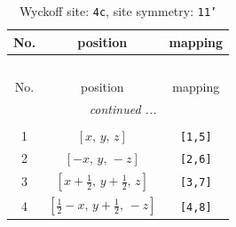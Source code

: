 \documentclass[fleqn,8pt]{jsarticle}
\begin{document}
\renewcommand{\arraystretch}{1.2}
\begin{longtable}{ccc}
\caption{Wyckoff site: {\tt 4c}, site symmetry: {\tt 11'}}
 \\
 \hline \hline
No. & position & mapping \\ \hline \endfirsthead

\multicolumn{2}{l}{\tablename\ \thetable{}} \\
 \hline \hline
No. & position & mapping \\ \hline \endhead

 \hline \hline
\multicolumn{2}{r}{\footnotesize\it continued ...} \\ \endfoot

 \hline \hline
\multicolumn{2}{r}{} \\ \endlastfoot

1 & $\left[ x,\, y,\, z \right]$ & {\tt [1,5]} \\ \hline
2 & $\left[ - x,\, y,\, - z \right]$ & {\tt [2,6]} \\ \hline
3 & $\left[ x + \frac{1}{2},\, y + \frac{1}{2},\, z \right]$ & {\tt [3,7]} \\ \hline
4 & $\left[ \frac{1}{2} - x,\, y + \frac{1}{2},\, - z \right]$ & {\tt [4,8]} \\
\end{longtable}
\end{document}
